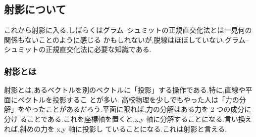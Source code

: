 \subsection{射影について}
これから射影に入る.しばらくはグラム--シュミットの正規直交化法とは一見何の関係もないことのように感じる
かもしれないが,脱線はほぼしていない.グラム--シュミットの正規直交化法に必要な知識である.
\subsubsection{射影とは}
射影とは,あるベクトルを別のベクトルに「投影」する操作である.特に,直線や平面にベクトルを投影するこ
とが多い.
高校物理を少しでもやった人は「力の分解」をやったことがあるだろう.平面に限れば,力の分解はある力を 2 つの成分に分け
ることである.これを座標軸を置くと,x,y 軸に分解することになる.言い換えれば,斜めの力を x,y 軸に投影し
ていることになる.これは射影と言える.
